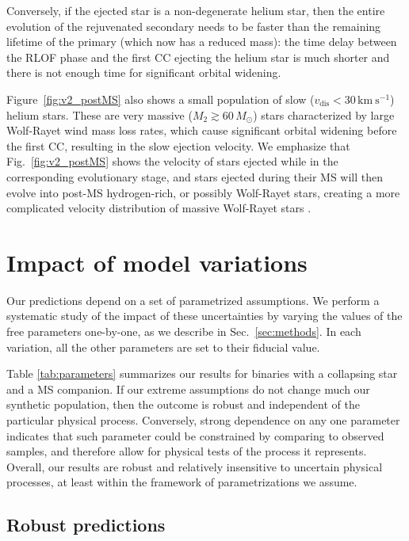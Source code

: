 \documentclass{aa}
\DeclareRobustCommand{\Figref}[1]{Fig.~\ref{#1}}
\DeclareRobustCommand{\Secref}[1]{Sec.~\ref{#1}}
\begin{document}
Conversely, if the ejected star is a non-degenerate helium
star, then the entire evolution of the rejuvenated secondary needs to
be faster than the remaining lifetime of the primary (which now
has a reduced mass): the time delay between the RLOF phase and the
first CC ejecting the helium star is much shorter and there is not enough
time for significant orbital widening.

Figure~\ref{fig:v2_postMS} also shows a small population of slow ($v_\mathrm{dis} <
30\,\mathrm{km\ s^{-1}}$) helium stars. These are very massive
($M_2\gtrsim 60\,M_\odot$) stars characterized by large Wolf-Rayet
wind mass loss rates, which cause significant orbital widening before
the first CC, resulting in the slow ejection velocity. We emphasize that \Figref{fig:v2_postMS} shows the velocity of
stars ejected while in the corresponding evolutionary stage, and stars
ejected during their MS will then evolve into post-MS hydrogen-rich,
or possibly Wolf-Rayet stars, creating a more complicated velocity distribution of
massive Wolf-Rayet stars \citep[see, e.g.,][]{dray:05, eldridge:11}.


\section{Impact of model variations}
\label{sec:param_variation}

Our predictions depend on a set of parametrized assumptions. We
perform a systematic study of the impact of these uncertainties by
varying the values of the free parameters one-by-one, as we describe in
\Secref{sec:methods}. In each variation, all the other parameters are set to their
fiducial value.

Table \ref{tab:parameters} summarizes our results for binaries with a
collapsing star and a MS companion. If our extreme assumptions
do not change much our synthetic population, then the outcome is
robust and independent of the particular physical process. Conversely,
strong dependence on any one parameter indicates that such parameter could be constrained by
comparing to observed samples, and therefore allow for physical tests
of the process it represents. Overall, our results are robust and relatively insensitive to
uncertain physical processes, at least within the framework of
parametrizations we assume.

\subsection{Robust  predictions}
\end{document}
